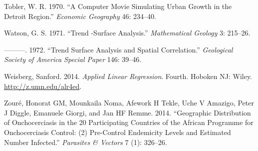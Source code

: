 \documentclass[
  letterpaper,
]{krantz}
\newlength{\cslhangindent}
\newlength{\cslentryspacingunit} %
\newenvironment{CSLReferences}[2] %
 {%
  \setlength{\parindent}{0pt}
  \ifodd #1
  \let\oldpar\par
  \def\par{\hangindent=\cslhangindent\oldpar}
  \fi
  \setlength{\parskip}{#2\cslentryspacingunit}
 }%
 {}
\begin{document}
\begin{CSLReferences}{1}{0}
\leavevmode{}%
Tobler, W. R. 1970. {``A Computer Movie Simulating Urban Growth in the
Detroit Region.''} \emph{Economic Geography} 46: 234--40.

\leavevmode{}%
Watson, G. S. 1971. {``Trend -Surface Analysis.''} \emph{Mathematical
Geology} 3: 215--26.

\leavevmode{}%
---------. 1972. {``Trend Surface Analysis and Spatial Correlation.''}
\emph{Geological Society of America Special Paper} 146: 39--46.

\leavevmode{}%
Weisberg, Sanford. 2014. \emph{Applied Linear Regression}. Fourth.
Hoboken {NJ}: Wiley. \url{http://z.umn.edu/alr4ed}.

\leavevmode{}%
Zouré, Honorat GM, Mounkaila Noma, Afework H Tekle, Uche V Amazigo,
Peter J Diggle, Emanuele Giorgi, and Jan HF Remme. 2014. {``Geographic
Distribution of Onchocerciasis in the 20 Participating Countries of the
African Programme for Onchocerciasis Control: (2) Pre-Control Endemicity
Levels and Estimated Number Infected.''} \emph{Parasites \& Vectors} 7
(1): 326--26.

\end{CSLReferences}
\end{document}
